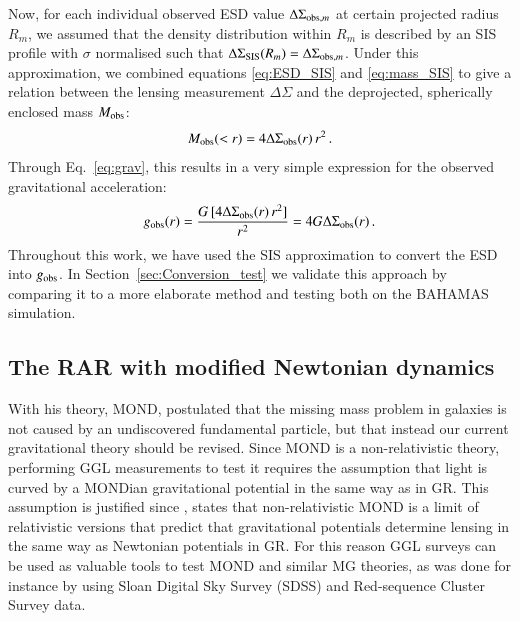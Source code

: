 \documentclass{aa}
\renewcommand{\Upsigma}{{\rm \Sigma}}
\renewcommand{\Updelta}{{\rm \Delta}}
\newcommand{\un}[1]{_{\rm #1}}
\begin{document}
Now, for each individual observed ESD value $\Updelta\Upsigma_{{\rm obs},m}$ at certain projected radius $R_{m}$, we assumed that the density distribution within $R_{m}$ is described by an SIS profile with $\sigma$ normalised such that $\Updelta\Upsigma\un{SIS}(R_{m}) = \Updelta\Upsigma_{{\rm obs},m}$. Under this approximation, we combined equations \ref{eq:ESD_SIS} and \ref{eq:mass_SIS} to give a relation between the lensing measurement $\Delta\Sigma$ and the deprojected, spherically enclosed mass $M_{\rm obs}$:
\begin{equation}\label{eq:Mobs}
M\un{obs}(<r) = 4 \Updelta\Upsigma\un{obs}(r) \, r^2 \, .
\end{equation}
Through Eq.~\ref{eq:grav}, this results in a very simple expression for the observed gravitational acceleration:
\begin{equation}
\label{eq:gobs_from_ESD}
g\un{obs}(r) = \frac{G \, [4 \Updelta\Upsigma\un{obs}(r) \, r^2]}{r^2} = 4 G \Updelta\Upsigma\un{obs}(r) \, .
\end{equation}
Throughout this work, we have used the SIS approximation to convert the ESD into $g\un{obs}$. In Section~\ref{sec:Conversion_test} we validate this approach by comparing it to a more elaborate method and testing both on the BAHAMAS simulation.


\subsection{The RAR with modified Newtonian dynamics}
\label{sec:MOND}

With his theory, MOND, \cite{milgrom1983} postulated that the missing mass problem in galaxies is not caused by an undiscovered fundamental particle, but that instead our current gravitational theory should be revised. Since MOND is a non-relativistic theory, performing GGL measurements to test it requires the assumption that light is curved by a MONDian gravitational potential in the same way as in GR. This assumption is justified since \citet[][while testing the MOND paradigm using GGL data from the Canada-France-Hawaii Telescope Lensing survey]{milgrom2013}, states that non-relativistic MOND is a limit of relativistic versions that predict that gravitational potentials determine lensing in the same way as Newtonian potentials in GR. For this reason GGL surveys can be used as valuable tools to test MOND and similar MG theories, as was done for instance by \cite{tian2009} using Sloan Digital Sky Survey (SDSS) and Red-sequence Cluster Survey data.
\end{document}
